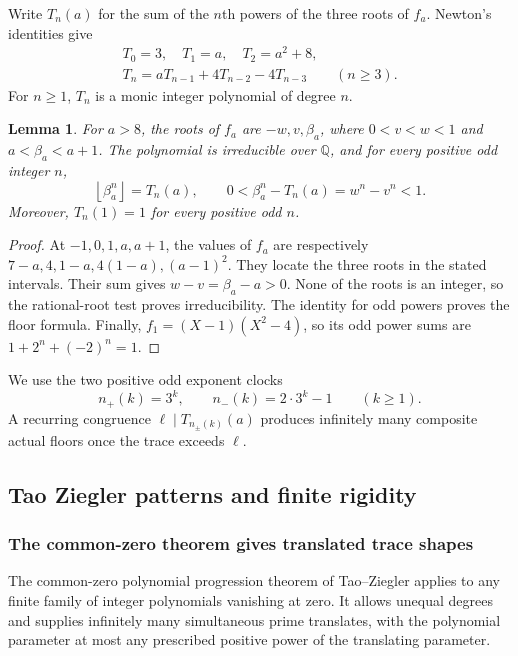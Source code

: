 \documentclass[11pt,a4paper]{article}
\newtheorem{lemma}[theorem]{Lemma}\newtheorem{proposition}[theorem]{Proposition}
\theoremstyle{definition}\newtheorem{definition}[theorem]{Definition}
\theoremstyle{remark}\newtheorem{remark}[theorem]{Remark}
\newcommand{\floor}[1]{\left\lfloor#1\right\rfloor}
\begin{document}
Write $T_n(a)$ for the sum of the $n$th powers of the three roots of
$f_a$. Newton's identities give
\begin{equation}\label{R18:eq:newton}
\begin{split}
 T_0=3,\quad T_1=a,\quad T_2=a^2+8,\\
 T_n=aT_{n-1}+4T_{n-2}-4T_{n-3}\qquad(n\ge3).
\end{split}
\end{equation}
For $n\ge1$, $T_n$ is a monic integer polynomial of degree $n$.

\begin{lemma}\label{R18:lem:floor}
For $a>8$, the roots of $f_a$ are $-w,v,\beta_a$, where
$0<v<w<1$ and $a<\beta_a<a+1$. The polynomial is irreducible over
$\mathbb Q$, and for every positive odd integer $n$,
\[
 \floor{\beta_a^n}=T_n(a),\qquad
 0<\beta_a^n-T_n(a)=w^n-v^n<1.
\]
Moreover, $T_n(1)=1$ for every positive odd $n$.
\end{lemma}
\begin{proof}
At $-1,0,1,a,a+1$, the values of $f_a$ are respectively
$7-a,4,1-a,4(1-a),(a-1)^2$. They locate the three roots in the
stated intervals. Their sum gives $w-v=\beta_a-a>0$. None of the
roots is an integer, so the rational-root test proves irreducibility.
The identity for odd powers proves the floor formula. Finally,
$f_1=(X-1)(X^2-4)$, so its odd power sums are $1+2^n+(-2)^n=1$.
\end{proof}

We use the two positive odd exponent clocks
\[
 n_+(k)=3^k,\qquad n_-(k)=2\cdot3^k-1\qquad(k\ge1).
\]
A recurring congruence $\ell\mid T_{n_\pm(k)}(a)$ produces infinitely
many composite actual floors once the trace exceeds $\ell$.

\subsection{Tao Ziegler patterns and finite rigidity}\label{R18:sec:tz}

\subsubsection{The common-zero theorem gives translated trace shapes}

The common-zero polynomial progression theorem of Tao--Ziegler
\cite{TZ2008} applies to any finite family of integer polynomials
vanishing at zero. It allows unequal degrees and supplies infinitely
many simultaneous prime translates, with the polynomial parameter at
most any prescribed positive power of the translating parameter.
\end{document}

